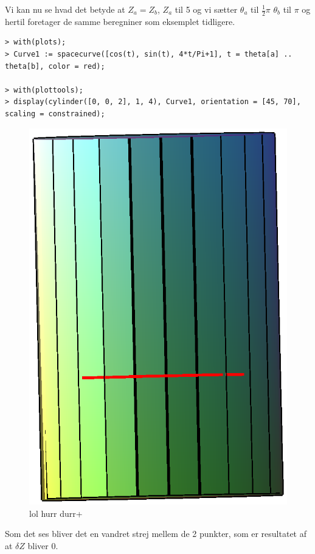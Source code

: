Vi kan nu se hvad det betyde at $Z_a=Z_b$, $Z_a$ til 5 og vi sætter $\theta_a$ til $\frac{1}{2}\pi$ $\theta_b$ til $\pi$ og hertil foretager de samme beregniner som eksemplet tidligere.
\begin{lstlisting}
> with(plots);
> Curve1 := spacecurve([cos(t), sin(t), 4*t/Pi+1], t = theta[a] .. theta[b], color = red);

> with(plottools);
> display(cylinder([0, 0, 2], 1, 4), Curve1, orientation = [45, 70], scaling = constrained);
\end{lstlisting}
\begin{figure}[h!]
\center
\includegraphics[scale=0.4]{pictures/Opg8_Fig2.eps}
\caption{lol hurr durr+}
\end{figure}
Som det ses bliver det en vandret strej mellem de 2 punkter, som er resultatet af at $\delta Z$ bliver 0.
